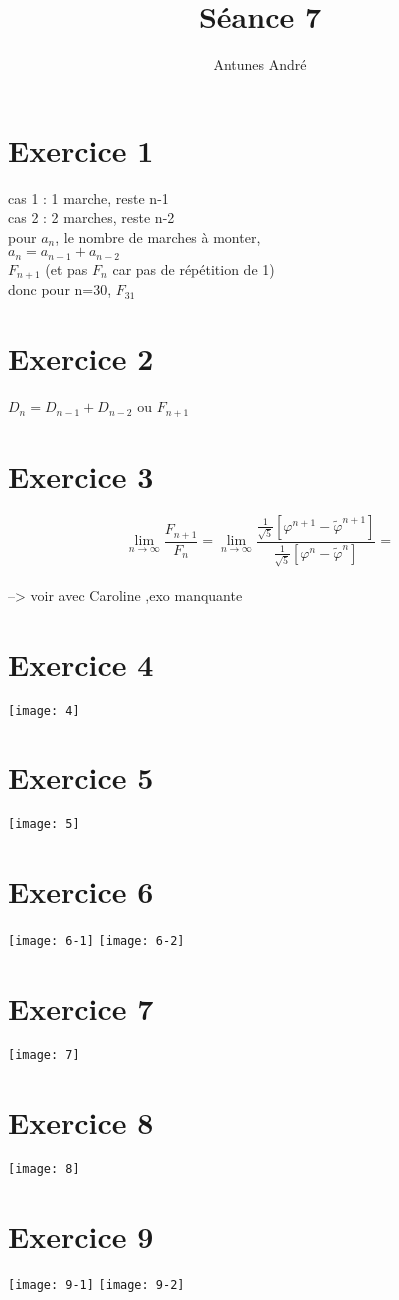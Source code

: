 \documentclass[fontsize=10pt]{article}
\title{\textbf{Séance 7}}
\author{Antunes André}
\date{}
\newcommand\tab[1][1cm]{\hspace*{#1}}
\begin{document}
\maketitle %

\section{Exercice 1}

cas 1 : 1 marche, reste n-1 \\
cas 2 : 2 marches, reste n-2 \\
\tab pour $a_{n}$, le nombre de marches à monter, \\
\tab \tab $a_{n} = a_{n-1}+a_{n-2}$ \\
\tab \tab $F_{n+1}$ (et pas $F_{n}$ car pas de répétition de 1)\\
\tab \tab donc pour n=30, $F_{31}$

\section{Exercice 2}
\tab \tab $D_{n} = D_{n-1}+D_{n-2}$ ou $F_{n+1}$ \\

\section{Exercice 3}
 $$\lim_{n\to\infty} \frac{F_{n+1}}{F_n{}} = \lim_{n\to\infty} \frac{\frac{1}{\sqrt{5}}[\varphi^{n+1}-\widetilde{\varphi}^{n+1}]}{{\frac{1}{\sqrt{5}}[\varphi^{n}-\widetilde{\varphi}^{n}]}} = $$ \\
 --> voir avec Caroline ,exo manquante
 
\clearpage
 
\section{Exercice 4}
\texttt{[image: 4]}

\section{Exercice 5}
\texttt{[image: 5]}

\section{Exercice 6}
\texttt{[image: 6-1]}
\texttt{[image: 6-2]}

\section{Exercice 7}
\texttt{[image: 7]}

\section{Exercice 8}
\texttt{[image: 8]}

\section{Exercice 9}
\texttt{[image: 9-1]}
\texttt{[image: 9-2]}
\end{document}
